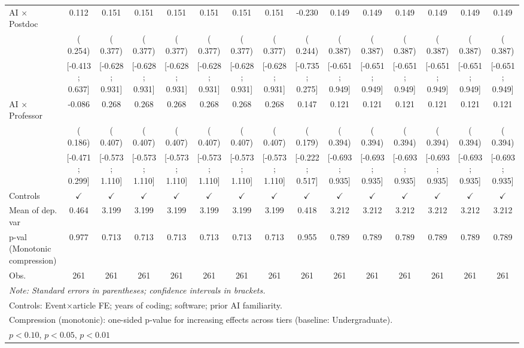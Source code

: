 \begin{tabular}{l*{14}{c}}
\\
AI × Postdoc &  0.112 &  0.151 &  0.151 &  0.151 &  0.151 &  0.151 &  0.151 & -0.230 &  0.149 &  0.149 &  0.149 &  0.149 &  0.149 &  0.149
\\
 & ( 0.254) & ( 0.377) & ( 0.377) & ( 0.377) & ( 0.377) & ( 0.377) & ( 0.377) & ( 0.244) & ( 0.387) & ( 0.387) & ( 0.387) & ( 0.387) & ( 0.387) & ( 0.387)
\\
 & [-0.413;  0.637] & [-0.628;  0.931] & [-0.628;  0.931] & [-0.628;  0.931] & [-0.628;  0.931] & [-0.628;  0.931] & [-0.628;  0.931] & [-0.735;  0.275] & [-0.651;  0.949] & [-0.651;  0.949] & [-0.651;  0.949] & [-0.651;  0.949] & [-0.651;  0.949] & [-0.651;  0.949]
\\
AI × Professor & -0.086 &  0.268 &  0.268 &  0.268 &  0.268 &  0.268 &  0.268 &  0.147 &  0.121 &  0.121 &  0.121 &  0.121 &  0.121 &  0.121
\\
 & ( 0.186) & ( 0.407) & ( 0.407) & ( 0.407) & ( 0.407) & ( 0.407) & ( 0.407) & ( 0.179) & ( 0.394) & ( 0.394) & ( 0.394) & ( 0.394) & ( 0.394) & ( 0.394)
\\
 & [-0.471;  0.299] & [-0.573;  1.110] & [-0.573;  1.110] & [-0.573;  1.110] & [-0.573;  1.110] & [-0.573;  1.110] & [-0.573;  1.110] & [-0.222;  0.517] & [-0.693;  0.935] & [-0.693;  0.935] & [-0.693;  0.935] & [-0.693;  0.935] & [-0.693;  0.935] & [-0.693;  0.935]
\\
\hline
Controls & $\checkmark$ & $\checkmark$ & $\checkmark$ & $\checkmark$ & $\checkmark$ & $\checkmark$ & $\checkmark$ & $\checkmark$ & $\checkmark$ & $\checkmark$ & $\checkmark$ & $\checkmark$ & $\checkmark$ & $\checkmark$
\\
Mean of dep. var &  0.464 &  3.199 &  3.199 &  3.199 &  3.199 &  3.199 &  3.199 &  0.418 &  3.212 &  3.212 &  3.212 &  3.212 &  3.212 &  3.212
\\
p-val (Monotonic compression) &  0.977 &  0.713 &  0.713 &  0.713 &  0.713 &  0.713 &  0.713 &  0.955 &  0.789 &  0.789 &  0.789 &  0.789 &  0.789 &  0.789
\\
Obs. & 261 & 261 & 261 & 261 & 261 & 261 & 261 & 261 & 261 & 261 & 261 & 261 & 261 & 261
\\
\hline
\hline\hline
\multicolumn{15}{l}{\it{Note:} Standard errors in parentheses; confidence intervals in brackets.}\\
\multicolumn{15}{l}{Controls: Event×article FE; years of coding; software; prior AI familiarity.}\\
\multicolumn{15}{l}{Compression (monotonic): one-sided p-value for increasing effects across tiers (baseline: Undergraduate).}\\
\multicolumn{15}{l}{\sym{*} $p<0.10$, \sym{**} $p<0.05$,  \sym{***} $p<0.01$}\\
\end{tabular}
